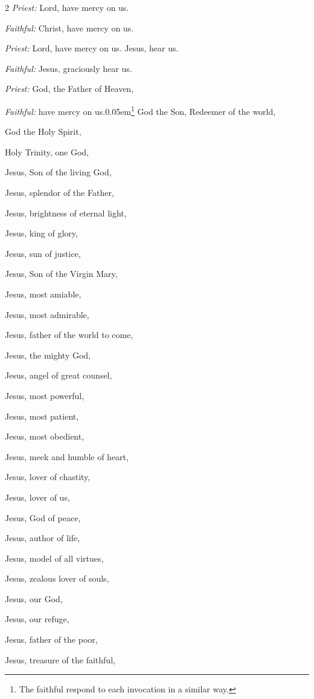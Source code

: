 
\begin{enpars}
\begin{multicols}{2}
\raggedcolumns 
\textit{Priest:}  Lord, have mercy on us.

\textit{Faithful:} Christ, have mercy on us.

\textit{Priest:}  Lord, have mercy on us. Jesus, hear us.

\textit{Faithful:} Jesus, graciously hear us.

\textit{Priest:}  God, the Father of Heaven,

\textit{Faithful:} have mercy on us.\kern 0.05em\footnote{\raggedright{The faithful respond to each invocation in a similar way.}\par}
God the Son, Redeemer of the world,

God the Holy Spirit,

Holy Trinity, one God,

Jesus, Son of the living God,

Jesus, splendor of the Father,

Jesus, brightness of eternal light,

Jesus, king of glory,

Jesus, sun of justice,

Jesus, Son of the Virgin Mary,

Jesus, most amiable,

Jesus, most admirable,

Jesus, father of the world to come,

Jesus, the mighty God,

Jesus, angel of great counsel,

Jesus, most powerful,

Jesus, most patient,

Jesus, most obedient,

Jesus, meek and humble of heart,

Jesus, lover of chastity,

Jesus, lover of us,

Jesus, God of peace,

Jesus, author of life,

Jesus, model of all virtues,

Jesus, zealous lover of souls,

Jesus, our God,

Jesus, our refuge,

Jesus, father of the poor,

Jesus, treasure of the faithful,


\end{multicols}
\end{enpars}
